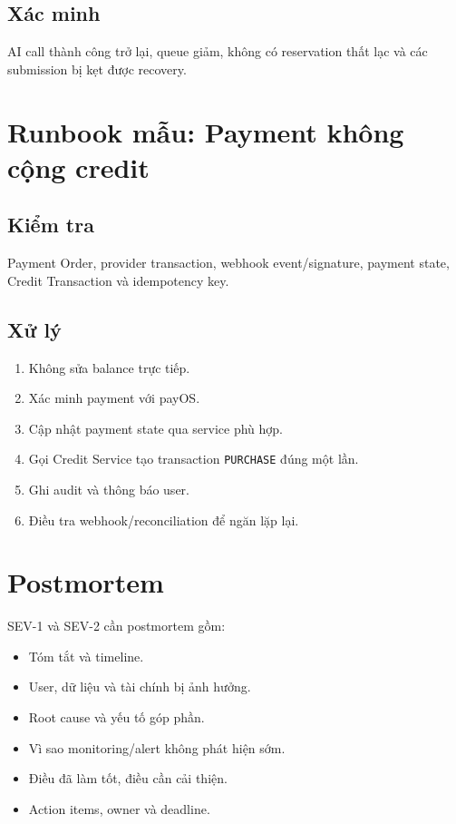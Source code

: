 \documentclass[11pt,a4paper]{article}
\newcommand{\code}[1]{\texttt{#1}}
\begin{document}
\subsection{Xác minh}

AI call thành công trở lại, queue giảm, không có reservation thất lạc và các submission bị kẹt được recovery.

\section{Runbook mẫu: Payment không cộng credit}

\subsection{Kiểm tra}

Payment Order, provider transaction, webhook event/signature, payment state, Credit Transaction và idempotency key.

\subsection{Xử lý}

\begin{enumerate}
  \item Không sửa balance trực tiếp.
  \item Xác minh payment với payOS.
  \item Cập nhật payment state qua service phù hợp.
  \item Gọi Credit Service tạo transaction \code{PURCHASE} đúng một lần.
  \item Ghi audit và thông báo user.
  \item Điều tra webhook/reconciliation để ngăn lặp lại.
\end{enumerate}

\section{Postmortem}

SEV-1 và SEV-2 cần postmortem gồm:

\begin{itemize}
  \item Tóm tắt và timeline.
  \item User, dữ liệu và tài chính bị ảnh hưởng.
  \item Root cause và yếu tố góp phần.
  \item Vì sao monitoring/alert không phát hiện sớm.
  \item Điều đã làm tốt, điều cần cải thiện.
  \item Action items, owner và deadline.
\end{itemize}
\end{document}
